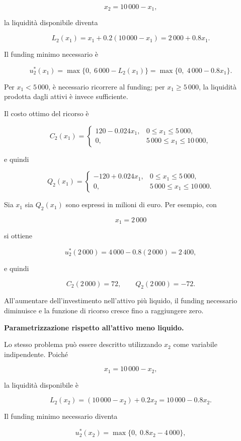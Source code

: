 \[
x_2=10\,000-x_1,
\]

\noindent la liquidit\`a disponibile diventa

\[
L_2(x_1)
=
x_1+0.2(10\,000-x_1)
=
2\,000+0.8x_1.
\]

Il funding minimo necessario \`e

\[
u_2^*(x_1)
=
\max\{0,\;6\,000-L_2(x_1)\}
=
\max\{0,\;4\,000-0.8x_1\}.
\]

Per $x_1<5\,000$, \`e necessario ricorrere al funding; per
$x_1\geq5\,000$, la liquidit\`a prodotta dagli attivi \`e invece sufficiente.

Il costo ottimo del ricorso \`e

\[
C_2(x_1)
=
\begin{cases}
120-0.024x_1, & 0\leq x_1\leq5\,000,\\[4pt]
0, & 5\,000\leq x_1\leq10\,000,
\end{cases}
\]

\noindent e quindi

\[
Q_2(x_1)
=
\begin{cases}
-120+0.024x_1, & 0\leq x_1\leq5\,000,\\[4pt]
0, & 5\,000\leq x_1\leq10\,000.
\end{cases}
\]

Sia $x_1$ sia $Q_2(x_1)$ sono espressi in milioni di euro. Per esempio, con

\[
x_1=2\,000
\]

\noindent si ottiene

\[
u_2^*(2\,000)
=
4\,000-0.8(2\,000)
=
2\,400,
\]

\noindent e quindi

\[
C_2(2\,000)=72,
\qquad
Q_2(2\,000)=-72.
\]

All'aumentare dell'investimento nell'attivo pi\`u liquido, il funding
necessario diminuisce e la funzione di ricorso cresce fino a raggiungere
zero.

\medskip

\noindent
\textbf{Parametrizzazione rispetto all'attivo meno liquido.}

Lo stesso problema pu\`o essere descritto utilizzando $x_2$ come variabile
indipendente. Poich\'e

\[
x_1=10\,000-x_2,
\]

\noindent la liquidit\`a disponibile \`e

\[
L_2(x_2)
=
(10\,000-x_2)+0.2x_2
=
10\,000-0.8x_2.
\]

Il funding minimo necessario diventa

\[
u_2^*(x_2)
=
\max\{0,\;0.8x_2-4\,000\},
\]

